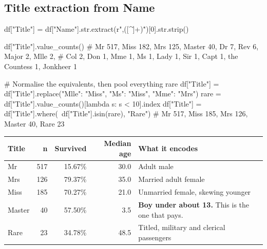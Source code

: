 \documentclass[11pt,a4paper]{article}
\begin{document}


\subsection{Title extraction from Name}


\begin{py}
df["Title"] = df["Name"].str.extract(r",\s*([^\.]+)\.")[0].str.strip()

df["Title"].value_counts()
# Mr 517, Miss 182, Mrs 125, Master 40, Dr 7, Rev 6, Major 2, Mlle 2,
# Col 2, Don 1, Mme 1, Ms 1, Lady 1, Sir 1, Capt 1, the Countess 1, Jonkheer 1

# Normalise the equivalents, then pool everything rare
df["Title"] = df["Title"].replace({"Mlle": "Miss", "Ms": "Miss", "Mme": "Mrs"})
rare = df["Title"].value_counts()[lambda s: s < 10].index
df["Title"] = df["Title"].where(~df["Title"].isin(rare), "Rare")
# Mr 517, Miss 185, Mrs 126, Master 40, Rare 23
\end{py}

\begin{tabularx}{\textwidth}{@{}l r r r X@{}}
\toprule
\rowcolor{tablehead} \textbf{Title} & \textbf{n} & \textbf{Survived} & \textbf{Median age} & \textbf{What it encodes} \\
\midrule
Mr & 517 & 15.67\% & 30.0 & Adult male \\
Mrs & 126 & 79.37\% & 35.0 & Married adult female \\
Miss & 185 & 70.27\% & 21.0 & Unmarried female, skewing younger \\
Master & 40 & 57.50\% & 3.5 & \textbf{Boy under about 13.} This is the one that pays. \\
Rare & 23 & 34.78\% & 48.5 & Titled, military and clerical passengers \\
\bottomrule
\end{tabularx}
\end{document}
